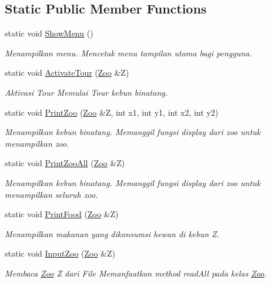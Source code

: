 \subsection*{Static Public Member Functions}
\begin{DoxyCompactItemize}
\item 
static void \hyperlink{classDriver_a3cbec9699953cf65b23eae3ced1338bb}{Show\+Menu} ()
\begin{DoxyCompactList}\small\item\em Menampilkan menu. Mencetak menu tampilan utama bagi pengguna. \end{DoxyCompactList}\item 
static void \hyperlink{classDriver_ab43c2330f27a0391bc39be75d348562a}{Activate\+Tour} (\hyperlink{classZoo}{Zoo} \&Z)
\begin{DoxyCompactList}\small\item\em Aktivasi Tour Memulai Tour kebun binatang. \end{DoxyCompactList}\item 
static void \hyperlink{classDriver_a631e22aab57fd7ac4200bccd6fbcb221}{Print\+Zoo} (\hyperlink{classZoo}{Zoo} \&Z, int x1, int y1, int x2, int y2)
\begin{DoxyCompactList}\small\item\em Menampilkan kebun binatang. Memanggil fungsi display dari zoo untuk menampilkan zoo. \end{DoxyCompactList}\item 
static void \hyperlink{classDriver_a73f290d28efdb356bbf0355cf99e3b1f}{Print\+Zoo\+All} (\hyperlink{classZoo}{Zoo} \&Z)
\begin{DoxyCompactList}\small\item\em Menampilkan kebun binatang. Memanggil fungsi display dari zoo untuk menampilkan seluruh zoo. \end{DoxyCompactList}\item 
static void \hyperlink{classDriver_aa7c89da61c5d5810a71048e6a49024e4}{Print\+Food} (\hyperlink{classZoo}{Zoo} \&Z)
\begin{DoxyCompactList}\small\item\em Menampilkan makanan yang dikonsumsi hewan di kebun Z. \end{DoxyCompactList}\item 
static void \hyperlink{classDriver_aff036df2efc67fbf6c20a1dcd3547855}{Input\+Zoo} (\hyperlink{classZoo}{Zoo} \&Z)
\begin{DoxyCompactList}\small\item\em Membaca \hyperlink{classZoo}{Zoo} Z dari File Memanfaatkan method read\+All pada kelas \hyperlink{classZoo}{Zoo}. \end{DoxyCompactList}\end{DoxyCompactItemize}


